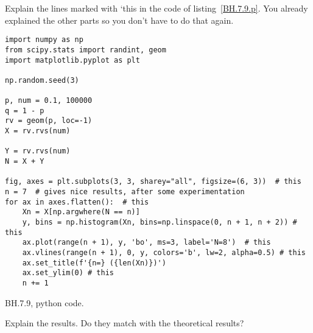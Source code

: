 \begin{exercise}
Explain the lines marked with `this in the code of listing~\cref{BH.7.9.p}. You already explained the other parts so you don't have to do that again.
\end{exercise}


\begin{listing}[!ht]
\begin{verbatim}
import numpy as np
from scipy.stats import randint, geom
import matplotlib.pyplot as plt

np.random.seed(3)

p, num = 0.1, 100000
q = 1 - p
rv = geom(p, loc=-1)
X = rv.rvs(num)

Y = rv.rvs(num)
N = X + Y

fig, axes = plt.subplots(3, 3, sharey="all", figsize=(6, 3))  # this
n = 7  # gives nice results, after some experimentation
for ax in axes.flatten():  # this
    Xn = X[np.argwhere(N == n)]
    y, bins = np.histogram(Xn, bins=np.linspace(0, n + 1, n + 2)) # this
    ax.plot(range(n + 1), y, 'bo', ms=3, label='N=8')  # this
    ax.vlines(range(n + 1), 0, y, colors='b', lw=2, alpha=0.5) # this
    ax.set_title(f'{n=} ({len(Xn)})')
    ax.set_ylim(0) # this
    n += 1
\end{verbatim}
\caption{BH.7.9, python code.}
\label{BH.7.9.p}
\end{listing}

\begin{exercise}
Explain the results. Do they match with the theoretical results?
\end{exercise}
